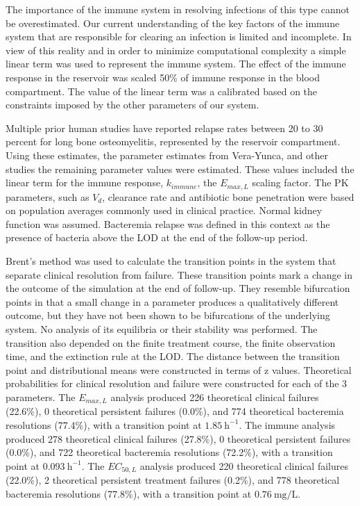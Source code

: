 \documentclass[utf8]{FrontiersinHarvard} %
\begin{document}
The importance of the immune system in resolving infections of this type cannot be overestimated.  Our current understanding of the key factors of the immune system that are responsible for clearing an infection is limited and incomplete.  In view of this reality and in order to minimize computational complexity a simple linear term was used to represent the immune system. The effect of the immune response in the reservoir was scaled 50\% of immune response in the blood compartment.  The value of the linear term was a calibrated based on the constraints imposed by the other parameters of our system.

Multiple prior human studies have reported relapse rates between 20 to 30 percent for long bone osteomyelitis, represented by the reservoir compartment.  Using these estimates, the parameter estimates from Vera-Yunca, and other studies the remaining parameter values were estimated.  These values included the linear term for the immune response, $k_{immune}$, the $E_{max,L}$ scaling factor.  The PK parameters, such as $V_{d}$, clearance rate and antibiotic bone penetration were based on population averages commonly used in clinical practice.  Normal kidney function was assumed.  Bacteremia relapse was defined in this context as the presence of bacteria above the LOD at the end of the follow-up period.

Brent's method was used to calculate the transition points in the system that separate clinical resolution from failure. These transition points mark a change in the outcome of the simulation at the end of follow-up. They resemble bifurcation points in that a small change in a parameter produces a qualitatively different outcome, but they have not been shown to be bifurcations of the underlying system.  No analysis of its equilibria or their stability was performed. The transition also depended on the finite treatment course, the finite observation time, and the extinction rule at the LOD. The distance between the transition point and distributional means were constructed in terms of z values.  Theoretical probabilities for clinical resolution and failure were constructed for each of the 3 parameters.  The $E_{max,L}$ analysis produced 226 theoretical clinical failures (22.6\%), 0 theoretical persistent failures (0.0\%), and 774 theoretical bacteremia resolutions (77.4\%), with a transition point at $1.85~\mathrm{h}^{-1}$. The immune analysis produced 278 theoretical clinical failures (27.8\%), 0 theoretical persistent failures (0.0\%), and 722 theoretical bacteremia resolutions (72.2\%), with a transition point at $0.093~\mathrm{h}^{-1}$.  The $EC_{50,L}$ analysis produced 220 theoretical clinical failures (22.0\%), 2 theoretical persistent treatment failures (0.2\%), and 778 theoretical bacteremia resolutions (77.8\%), with a transition point at $0.76~\mathrm{mg/L}$.
\end{document}
